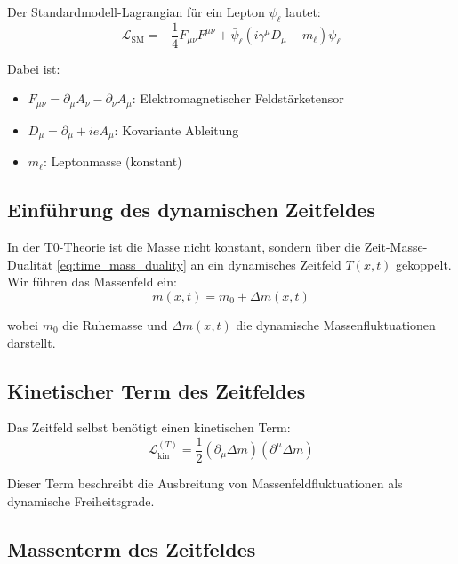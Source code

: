 	Der Standardmodell-Lagrangian für ein Lepton $\psi_\ell$ lautet:
	\begin{equation}
		\mathcal{L}_{\text{SM}} = -\frac{1}{4} F_{\mu\nu}F^{\mu\nu} + \bar{\psi}_\ell(i\gamma^\mu D_\mu - m_\ell)\psi_\ell
		\label{eq:sm_lagrangian}
	\end{equation}
	
	Dabei ist:
	\begin{itemize}
		\item $F_{\mu\nu} = \partial_\mu A_\nu - \partial_\nu A_\mu$: Elektromagnetischer Feldstärketensor
		\item $D_\mu = \partial_\mu + ie A_\mu$: Kovariante Ableitung
		\item $m_\ell$: Leptonmasse (konstant)
	\end{itemize}
	
	\subsection{Einführung des dynamischen Zeitfeldes}
	
	In der T0-Theorie ist die Masse nicht konstant, sondern über die Zeit-Masse-Dualität \eqref{eq:time_mass_duality} an ein dynamisches Zeitfeld $T(x,t)$ gekoppelt. Wir führen das Massenfeld ein:
	\begin{equation}
		m(x,t) = m_0 + \Delta m(x,t)
		\label{eq:mass_field}
	\end{equation}
	
	wobei $m_0$ die Ruhemasse und $\Delta m(x,t)$ die dynamische Massenfluktuationen darstellt.
	
	\subsection{Kinetischer Term des Zeitfeldes}
	
	Das Zeitfeld selbst benötigt einen kinetischen Term:
	\begin{equation}
		\mathcal{L}_{\text{kin}}^{(T)} = \frac{1}{2}(\partial_\mu \Delta m)(\partial^\mu \Delta m)
		\label{eq:time_field_kinetic}
	\end{equation}
	
	Dieser Term beschreibt die Ausbreitung von Massenfeldfluktuationen als dynamische Freiheitsgrade.
	
	\subsection{Massenterm des Zeitfeldes}
	
